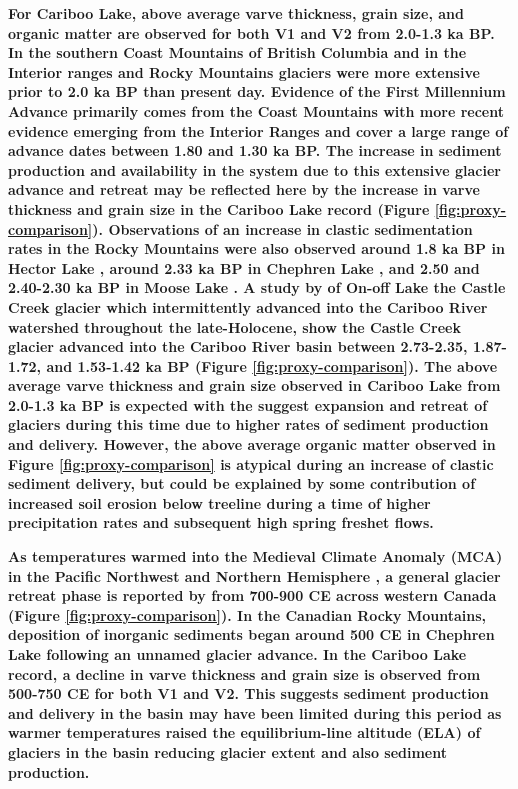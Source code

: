 \documentclass[Royal,times,doublespace,sageh]{sagej}
\begin{document}
\textbf{For Cariboo Lake, above average varve thickness, grain size, and
organic matter are observed for both V1 and V2 from 2.0-1.3 ka BP. In
the southern Coast Mountains of British Columbia
\citep{Koch2007a, Osborn2007, Allen2007, Clague2010} and in the Interior
ranges and Rocky Mountains \citep{Luckman1993, Luckman1995} glaciers
were more extensive prior to 2.0 ka BP than present day. Evidence of the
First Millennium Advance primarily comes from the Coast Mountains
\citep{Reyes2006, Osborn2007} with more recent evidence emerging from
the Interior Ranges \citep{Maurer2012b} and cover a large range of
advance dates between 1.80 and 1.30 ka BP. The increase in sediment
production and availability in the system due to this extensive glacier
advance and retreat may be reflected here by the increase in varve
thickness and grain size in the Cariboo Lake record (Figure
\ref{fig:proxy-comparison}). Observations of an increase in clastic
sedimentation rates in the Rocky Mountains were also observed around 1.8
ka BP in Hector Lake \citep{Leonard1997}, around 2.33 ka BP in Chephren
Lake \citep{Dirszowsky1997a}, and 2.50 and 2.40-2.30 ka BP in Moose Lake
\citep{Desloges1999}. A study by \citet{Maurer2012b} of On-off Lake the
Castle Creek glacier which intermittently advanced into the Cariboo
River watershed throughout the late-Holocene, show the Castle Creek
glacier advanced into the Cariboo River basin between 2.73-2.35,
1.87-1.72, and 1.53-1.42 ka BP (Figure \ref{fig:proxy-comparison}). The
above average varve thickness and grain size observed in Cariboo Lake
from 2.0-1.3 ka BP is expected with the suggest expansion and retreat of
glaciers during this time due to higher rates of sediment production and
delivery. However, the above average organic matter observed in Figure
\ref{fig:proxy-comparison} is atypical during an increase of clastic
sediment delivery, but could be explained by some contribution of
increased soil erosion below treeline during a time of higher
precipitation rates and subsequent high spring freshet flows.}

\textbf{As temperatures warmed into the Medieval Climate Anomaly (MCA)
in the Pacific Northwest \citep{Steinman2012} and Northern Hemisphere
\citep{Moberg2005}, a general glacier retreat phase is reported by
\citet{Solomina2016} from 700-900 CE across western Canada (Figure
\ref{fig:proxy-comparison}). In the Canadian Rocky Mountains, deposition
of inorganic sediments began around 500 CE in Chephren Lake
\citep{Dirszowsky1997} following an unnamed glacier advance. In the
Cariboo Lake record, a decline in varve thickness and grain size is
observed from 500-750 CE for both V1 and V2. This suggests sediment
production and delivery in the basin may have been limited during this
period as warmer temperatures raised the equilibrium-line altitude (ELA)
of glaciers in the basin reducing glacier extent and also sediment
production.}
\end{document}

